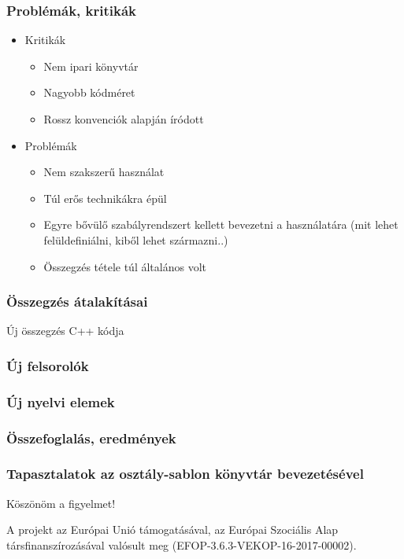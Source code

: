 \documentclass[11pt]{beamer}
\begin{document}
\begin{frame}
	\frametitle{Problémák, kritikák}
	\begin{itemize}
		\item Kritikák
		\begin{itemize}
			\item Nem ipari könyvtár
			\item Nagyobb kódméret
			\item Rossz konvenciók alapján íródott
		\end{itemize}
		\item Problémák
		\begin{itemize}
			\item Nem szakszerű használat
			\item Túl erős technikákra épül
			\item Egyre bővülő szabályrendszert kellett  bevezetni a használatára (mit lehet felüldefiniálni, kiből lehet származni..)
			\item Összegzés tétele túl általános volt
		\end{itemize}
	\end{itemize}
\end{frame}

\begin{frame}
	\frametitle{Összegzés átalakításai}
	\begin{block}{Új összegzés C++ kódja}

	\end{block}
\end{frame}

\begin{frame}
	\frametitle{Új felsorolók}
\end{frame}

\begin{frame}
	\frametitle{Új nyelvi elemek}
\end{frame}

\begin{frame}
	\frametitle{Összefoglalás, eredmények}
\end{frame}

\begin{frame}
	\frametitle{Tapasztalatok az osztály-sablon könyvtár bevezetésével}
	\begin{center}
		\Large{Köszönöm a figyelmet!}
	
	\vspace*{25px}
	{\small A projekt az Európai Unió támogatásával, az Európai Szociális Alap társfinanszírozásával valósult meg (EFOP-3.6.3-VEKOP-16-2017-00002).}\end{center}
\end{frame}
\end{document}
